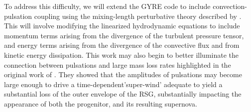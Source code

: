  To address this difficulty, we will extend the GYRE code to include convection-pulsation coupling using the mixing-length perturbative theory described by \citet{Grigahcene:2005}. This will involve modifying the linearized hydrodynamic equations to include momentum terms arising from the divergence of the turbulent pressure tensor, and energy terms arising from the divergence of the convective flux and from kinetic energy dissipation. This work may also begin to better illuminate the connection between pulsations and large mass loss rates highlighted in the original work of \citet{Yoon_2010}. They showed that the amplitudes of pulsations may become large enough to drive a time-dependent'super-wind' adequate to yield a substantial loss of the outer envelope of the RSG, substantially impacting the appearance of both the progenitor, and its resulting supernova.